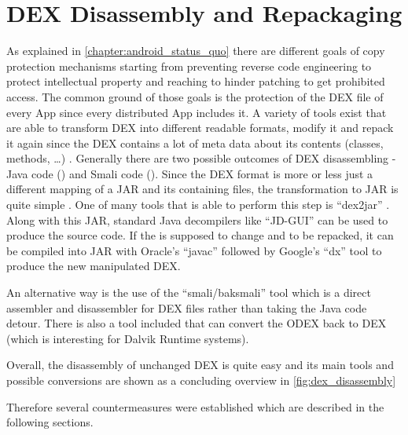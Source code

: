 


\section{DEX Disassembly and Repackaging}
As explained in \autoref{chapter:android_status_quo} there
are different goals of copy protection mechanisms starting from
preventing reverse code engineering to protect intellectual property
and reaching to hinder patching to get prohibited access.
The common ground of those goals is the protection of
the DEX file of every App since every distributed App includes
it. A variety of tools exist that
are able to transform DEX into different readable formats,
modify it and repack it again since the DEX contains
a lot of meta data about its contents (classes, methods, \ldots)
\parencite{dex}.
Generally there are two possible outcomes of DEX disassembling
- Java code () and Smali code ().
Since the DEX format is more or less just a different mapping of a
JAR and its containing  files, the transformation to JAR
is quite simple \parencite{dvminternals}. One of many tools that is able to
perform this step is ``dex2jar'' \parencite{dex2jartool}.
Along with this JAR, standard Java decompilers like ``JD-GUI''
\parencite{jdtool} can be used to produce the  source code.
If the  is supposed to change and to be repacked, it can
be compiled into JAR with Oracle's ``javac'' \parencite{javactool}
followed by Google's ``dx'' tool \parencite{dxtool}
to produce the new manipulated DEX.

An alternative way is the use of the ``smali/baksmali'' tool
\parencite{smalitool} which is a direct assembler and disassembler
for DEX files rather than taking the Java code detour. There is also
a tool included that can convert the ODEX back to DEX (which is interesting
for Dalvik Runtime systems).

Overall, the disassembly of unchanged DEX is quite easy and
its main tools and possible conversions are shown
as a concluding overview in \autoref{fig:dex_disassembly}

Therefore several countermeasures were established which are
described in the following sections.

